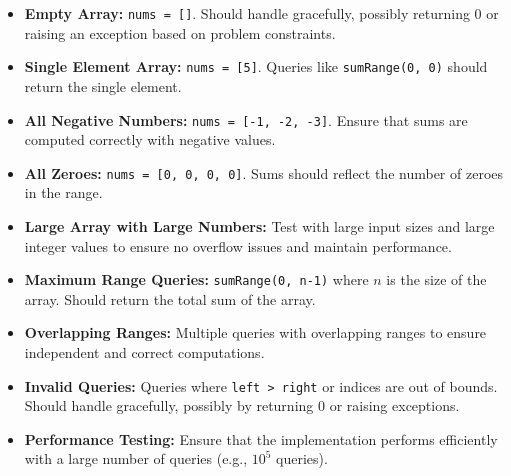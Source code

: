 \begin{itemize}
    \item \textbf{Empty Array:} \texttt{nums = []}. Should handle gracefully, possibly returning 0 or raising an exception based on problem constraints.
    
    \item \textbf{Single Element Array:} \texttt{nums = [5]}. Queries like \texttt{sumRange(0, 0)} should return the single element.
    
    \item \textbf{All Negative Numbers:} \texttt{nums = [-1, -2, -3]}. Ensure that sums are computed correctly with negative values.
    
    \item \textbf{All Zeroes:} \texttt{nums = [0, 0, 0, 0]}. Sums should reflect the number of zeroes in the range.
    
    \item \textbf{Large Array with Large Numbers:} Test with large input sizes and large integer values to ensure no overflow issues and maintain performance.
    
    \item \textbf{Maximum Range Queries:} \texttt{sumRange(0, n-1)} where \( n \) is the size of the array. Should return the total sum of the array.
    
    \item \textbf{Overlapping Ranges:} Multiple queries with overlapping ranges to ensure independent and correct computations.
    
    \item \textbf{Invalid Queries:} Queries where \texttt{left > right} or indices are out of bounds. Should handle gracefully, possibly by returning 0 or raising exceptions.
    
    \item \textbf{Performance Testing:} Ensure that the implementation performs efficiently with a large number of queries (e.g., \( 10^5 \) queries).
\end{itemize}

\printindex